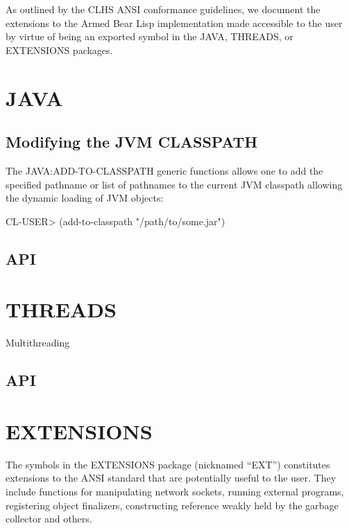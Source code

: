 \documentclass[10pt]{book}
\begin{document}
As outlined by the CLHS ANSI conformance guidelines, we document the
extensions to the Armed Bear Lisp implementation made accessible to
the user by virtue of being an exported symbol in the JAVA, THREADS,
or EXTENSIONS packages.

\section{JAVA}

\subsection{Modifying the JVM CLASSPATH}

The JAVA:ADD-TO-CLASSPATH generic functions allows one to add the
specified pathname or list of pathnames to the current JVM classpath
allowing the dynamic loading of JVM objects:

\begin{listing-lisp}
CL-USER> (add-to-classpath "/path/to/some.jar")
\end{listing-lisp}

\subsection{API}



\section{THREADS}

Multithreading

\subsection{API}



\section{EXTENSIONS}

The symbols in the EXTENSIONS package (nicknamed ``EXT'') constitutes
extensions to the ANSI standard that are potentially useful to the
user.  They include functions for manipulating network sockets,
running external programs, registering object finalizers, constructing
reference weakly held by the garbage collector and others.
\end{document}
